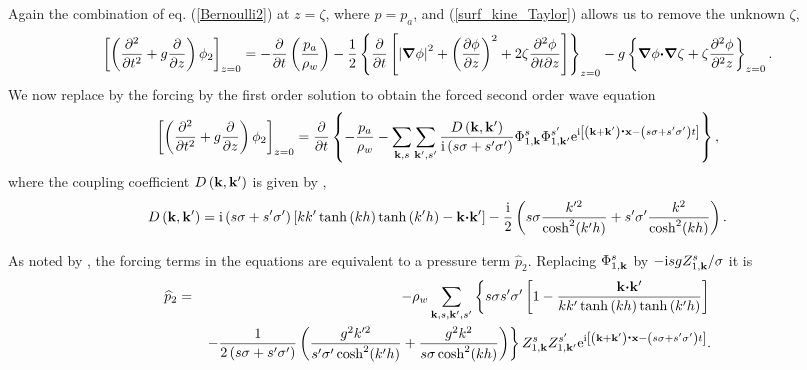 Again the combination of eq. (\ref{Bernoulli2}) at $z=\zeta$, where $p=p_a$, and (\ref{surf_kine_Taylor}) allows us to remove the unknown $\zeta$, 
\begin{equation}
\left[\left(\frac{\partial ^{2}}{\partial t^{2}}
    +g \frac{\partial }{\partial z}\right) \phi_2\right]_{z=0}
    =-\frac{ \partial }{\partial t}\left(\frac{p_a}{\rho_w}\right) - \frac{1}{2} \left\{\frac{\partial }{\partial t}\left[
\left|\mbox{\boldmath $\nabla$} \phi\right|^2     +\left(\frac{\partial \phi}{\partial z}\right)^2 +2 \zeta \frac{\partial^2 \phi}{\partial t \partial z}\right]
\right\}_{z=0} - g \left\{\mbox{\boldmath $\nabla$}  \phi \mbox{\boldmath $\cdot$}  \mbox{\boldmath $\nabla$} \zeta +  \zeta \frac{\partial^2 \phi}{\partial^2 z}\right\}_{z=0}. 
\end{equation}
We now replace by the forcing by the first order solution to obtain the forced second order wave equation
\begin{equation}
\left[\left(\frac{\partial ^{2}}{\partial t^{2}}
    +g \frac{\partial }{\partial z}\right) \phi_2\right]_{z=0}
    =\frac{ \partial }{\partial t}\left\{ -\frac{p_a}{\rho_w} - \sum_{\mathbf{k},s} \sum_{\mathbf{k^{\prime}},s'} \frac{D\left(\mathbf{k},\mathbf{k^{\prime}}\right)}{{\mathrm i} \left(s \sigma+s' \sigma'\right)}
    \Phi _{1,\mathbf{k}}^{s}\Phi _{1,\mathbf{k^{\prime}}}^{s'} \mathrm{e}^{\mathrm{i}
    \left[\left(\mathbf{k}+\mathbf{k^{\prime}}\right)\mbox{\boldmath $\cdot$}{\mathbf x} - \left(s \sigma+s' \sigma'   \right) t\right]}\right\},\label{surface_2c}
\end{equation}
where the coupling coefficient  $D\left(\mathbf{k},{\mathbf
k'}\right)$ is given by  \cite{Hasselmann1962}, 
\begin{equation}
     D\left(\mathbf{k},\mathbf{k^{\prime}}\right) = 
    {\mathrm i} \left(s \sigma+s' \sigma'\right)
    \left[k k' \tanh \left(k h \right)
    \tanh \left(k' h\right)-\mathbf{k} \mbox{\boldmath $\cdot$} \mathbf{k^{\prime}} \right]-\frac{\mathrm{i}}{2} \left(s \sigma \frac{k'^2}{\cosh^2(k'h)}+s' \sigma' \frac{k^2}{\cosh^2(k h)}\right).\label{D_coupling2nd_order}
\end{equation}


As noted by  \cite{Hasselmann1963c}, the forcing terms in the equations are equivalent to a pressure term $\widehat{p}_2$.  Replacing   
$\Phi _{1,\mathbf{k}}^{s}$ by $-\mathrm{i} s g   Z_{1,\mathbf{k}}^{s}/\sigma$ it is  
\begin{eqnarray}
     \widehat{p}_2 &=& -\rho_w \sum_{\mathbf{k},s,\mathbf{k^{\prime}},s'}     
      \left\{ s \sigma s' \sigma' \left[1 - \frac{\mathbf{k} \mbox{\boldmath $\cdot$} \mathbf{k^{\prime}}}{k k'  \tanh \left(k h \right)
    \tanh \left(k' h\right)} \right] \right. \nonumber\\
    & &\left. -\frac{1}{2 \left(s \sigma+s' \sigma'\right)} 
\left(\frac{g^2 k'^2}{s' \sigma' \cosh^2(k'h)}+\frac{g^2 k^2}{s \sigma \cosh^2(k h)}\right)\right\}
    Z_{1,\mathbf{k}}^{s} Z_{1,\mathbf{k^{\prime}}}^{s'} \mathrm{e}^{\mathrm{i}
    \left[\left(\mathbf{k}+\mathbf{k^{\prime}}\right)\mbox{\boldmath $\cdot$}{\mathbf x} - \left(s \sigma+s' \sigma'   \right) t\right]}.\label{eq:p2surf}
\end{eqnarray}


